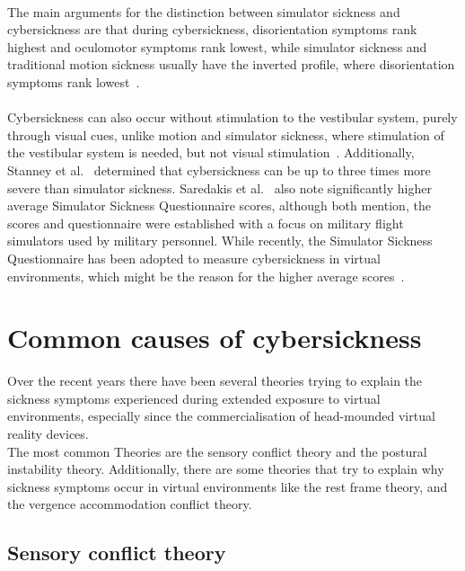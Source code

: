 \\
The main arguments for the distinction between simulator sickness and cybersickness are that during cybersickness,
disorientation symptoms rank highest and oculomotor symptoms rank lowest, while simulator sickness and traditional
motion sickness usually have the inverted profile, where disorientation symptoms rank lowest~\cite{Stanney1997}.
\\
\\
Cybersickness can also occur without stimulation to the vestibular system, purely through visual cues, unlike motion
and simulator sickness, where stimulation of the vestibular system is needed, but not visual stimulation~\cite{LaViola2000}.
Additionally, Stanney et al.~\cite{Stanney1997} determined that cybersickness can be up to three times more severe
than simulator sickness.
Saredakis et al.~\cite{Saredakis2020} also note significantly higher average Simulator Sickness Questionnaire scores,
although both mention, the scores and questionnaire were established with a focus on military flight simulators used
by military personnel.
While recently, the Simulator Sickness Questionnaire has been adopted to measure cybersickness in virtual
environments, which might be the reason for the higher average scores~\cite{Saredakis2020}.


\section{Common causes of cybersickness}\label{sec:common-causes-of-cybersickness}

Over the recent years there have been several theories trying to explain the sickness symptoms experienced during
extended exposure to virtual environments, especially since the commercialisation of head-mounded virtual reality
devices.
\\
The most common Theories are the sensory conflict theory and the postural instability theory.
Additionally, there are some theories that try to explain why sickness symptoms occur in virtual environments like the
rest frame theory, and the vergence accommodation conflict theory.


\subsection{Sensory conflict theory}\label{subsec:sensory-conflict-theory}

